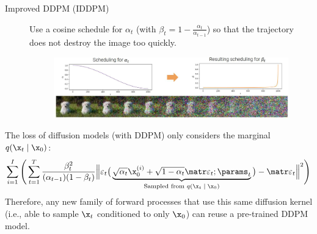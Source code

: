 \begin{description}
    \item[Improved DDPM (IDDPM)] 
        Use a cosine schedule for $\alpha_t$ (with $\beta_t = 1-\frac{\alpha_t}{\alpha_{t-1}}$) so that the trajectory does not destroy the image too quickly.
        \begin{figure}[H]
            \centering
            \includegraphics[width=0.85\linewidth]{./img/iddpm_schedule.jpg}
        \end{figure}
\end{description}

\begin{remark}
    The loss of diffusion models (with DDPM) only considers the marginal $q(\x_t \mid \x_0)$:
    \[ \sum_{i=1}^{I} \Bigg( \sum_{t=1}^{T} \frac{\beta_t^2}{(\alpha_{t-1})(1-\beta_t)} \Big\Vert \varepsilon_t
    \big( \underbrace{\sqrt{\alpha_t} \x_0^{(i)} + \sqrt{1-\alpha_t} \noise_t; \params_t}_\text{Sampled from $q(\x_t \mid \x_0)$} \big)
     - \noise_t \Big\Vert^2 \Bigg) \]
    Therefore, any new family of forward processes that use this same diffusion kernel (i.e., able to sample $\x_t$ conditioned to only $\x_0$) can reuse a pre-trained DDPM model.
\end{remark}

